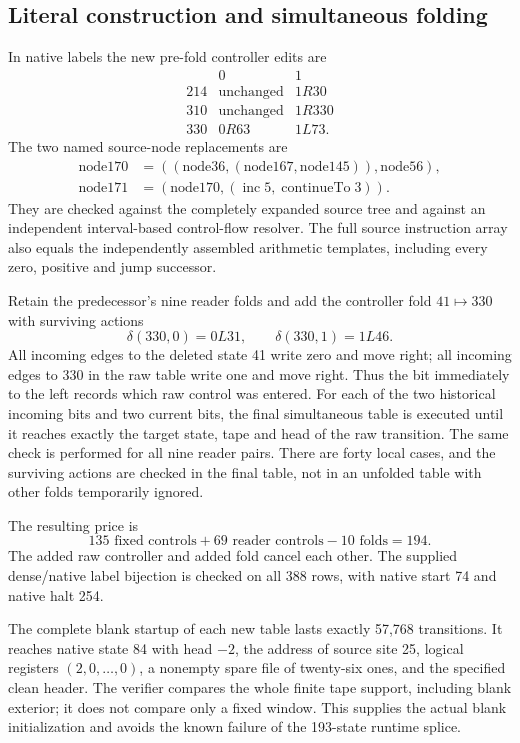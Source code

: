\subsection{Literal construction and simultaneous folding}

In native labels the new pre-fold controller edits are
\[
\begin{array}{c|cc}
 &0&1\\\hline
214&\text{unchanged}&1R30\\
310&\text{unchanged}&1R330\\
330&0R63&1L73.
\end{array}
\]
The two named source-node replacements are
\[
\begin{split}
\mathrm{node170}&=((\mathrm{node36},(\mathrm{node167},
                   \mathrm{node145})),\mathrm{node56}),\\
\mathrm{node171}&=(\mathrm{node170},
                  (\operatorname{inc}5,\operatorname{continueTo}3)).
\end{split}
\]
They are checked against the completely expanded source tree and against
an independent interval-based control-flow resolver.  The full source
instruction array also equals the independently assembled arithmetic
templates, including every zero, positive and jump successor.

Retain the predecessor's nine reader folds and add the controller fold
$41\mapsto330$ with surviving actions
\[
 \delta(330,0)=0L31,\qquad \delta(330,1)=1L46.
\]
All incoming edges to the deleted state 41 write zero and move right;
all incoming edges to 330 in the raw table write one and move right.
Thus the bit immediately to the left records which raw control was
entered.  For each of the two historical incoming bits and two current
bits, the final simultaneous table is executed until it reaches exactly
the target state, tape and head of the raw transition.  The same check
is performed for all nine reader pairs.  There are forty local cases,
and the surviving actions are checked in the final table, not in an
unfolded table with other folds temporarily ignored.

The resulting price is
\[
 135\text{ fixed controls}+69\text{ reader controls}
       -10\text{ folds}=194.
\]
The added raw controller and added fold cancel each other.  The supplied
dense/native label bijection is checked on all 388 rows, with native
start 74 and native halt 254.

The complete blank startup of each new table lasts exactly 57,768
transitions.  It reaches native state 84 with head $-2$, the address of
source site 25, logical registers $(2,0,\ldots,0)$, a nonempty spare file
of twenty-six ones, and the specified clean header.  The verifier
compares the whole finite tape support, including blank exterior; it
does not compare only a fixed window.  This supplies the actual blank
initialization and avoids the known failure of the 193-state runtime
splice.

